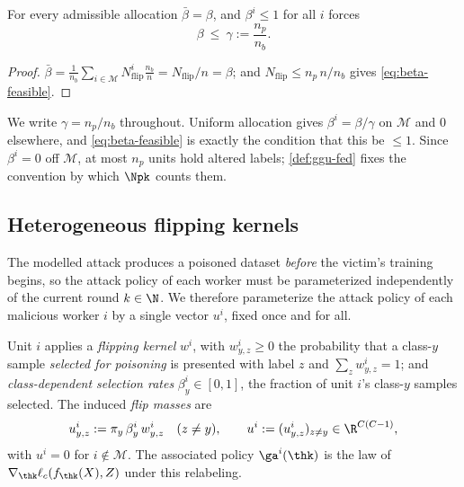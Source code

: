 \begin{lemma}
\label{lem:beta-bar}
For every admissible allocation $\bar\beta=\beta$, and $\beta^i\le1$ for all $i$ forces
\begin{equation}
\beta\ \le\ \gamma:=\frac{n_p}{n_b}.
\label{eq:beta-feasible}
\end{equation}
\end{lemma}
\begin{proof}
$\bar\beta=\tfrac1{n_b}\sum_{i\in\mathcal{M}}N^i_{\mathrm{flip}}\tfrac{n_b}{n}=N_{\mathrm{flip}}/n=\beta$; and $N_{\mathrm{flip}}\le n_p\,n/n_b$ gives \cref{eq:beta-feasible}.
\end{proof}

We write $\gamma=n_p/n_b$ throughout. Uniform allocation gives $\beta^i=\beta/\gamma$ on
$\mathcal{M}$ and $0$ elsewhere, and \cref{eq:beta-feasible} is exactly the condition that this
be $\le1$. Since $\beta^i=0$ off $\mathcal{M}$, at most $n_p$ units hold altered labels;
\cref{def:ggu-fed} fixes the convention by which $\Npk$ counts them.


\subsection{Heterogeneous flipping kernels}
\label{sec:kernels}

The modelled attack produces a poisoned dataset \emph{before} the victim's training begins, so
the attack policy of each worker must be parameterized independently of the current round
$k\in\N$. We therefore parameterize the attack policy of each malicious worker $i$ by a single
vector $u^i$, fixed once and for all.

\begin{definition}
\label{def:kernel}
Unit $i$ applies a \emph{flipping kernel} $w^i$, with $w^i_{y,z}\ge0$ the probability that a class-$y$ sample \emph{selected for poisoning} is presented with label $z$ and $\sum_zw^i_{y,z}=1$; and \emph{class-dependent selection rates} $\beta^i_y\in[0,1]$, the fraction of unit $i$'s class-$y$ samples selected. The induced \emph{flip masses} are
\begin{equation}
u^i_{y,z}:=\pi_y\,\beta^i_y\,w^i_{y,z}\quad(z\neq y),
\qquad u^i:=(u^i_{y,z})_{z\neq y}\in\R^{C(C-1)},
\end{equation}
with $u^i=0$ for $i\notin\mathcal{M}$. The associated policy $\ga^i(\thk)$ is the law of $\nabla_{\thk}\ell_c(f_{\thk}(X),Z)$ under this relabeling.
\end{definition}

